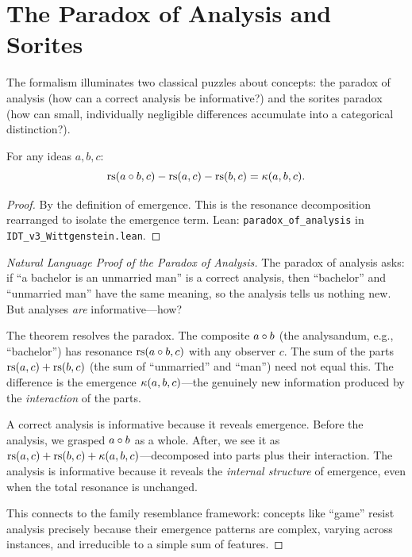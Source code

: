 \section{The Paradox of Analysis and Sorites}

The formalism illuminates two classical puzzles about concepts: the paradox of
analysis (how can a correct analysis be informative?) and the sorites paradox
(how can small, individually negligible differences accumulate into a categorical
distinction?).

\begin{theorem}
\label{thm:paradox-analysis}
For any ideas $a, b, c$:
\[
\mathrm{rs}(a \circ b, c) - \mathrm{rs}(a, c) - \mathrm{rs}(b, c) = \kappa(a, b, c).
\]
\end{theorem}

\begin{proof}
By the definition of emergence. This is the resonance decomposition rearranged
to isolate the emergence term.
Lean: \texttt{paradox\_of\_analysis} in \texttt{IDT\_v3\_Wittgenstein.lean}.
\end{proof}

\begin{proof}[Natural Language Proof of the Paradox of Analysis]
The paradox of analysis asks: if ``a bachelor is an unmarried man'' is a correct
analysis, then ``bachelor'' and ``unmarried man'' have the same meaning, so the
analysis tells us nothing new. But analyses \emph{are} informative---how?

The theorem resolves the paradox. The composite $a \circ b$ (the analysandum,
e.g., ``bachelor'') has resonance $\mathrm{rs}(a \circ b, c)$ with any observer $c$.
The sum of the parts $\mathrm{rs}(a, c) + \mathrm{rs}(b, c)$ (the sum of ``unmarried'' and ``man'')
need not equal this. The difference is the emergence $\kappa(a, b, c)$---the
genuinely new information produced by the \emph{interaction} of the parts.

A correct analysis is informative because it reveals emergence. Before the
analysis, we grasped $a \circ b$ as a whole. After, we see it as
$\mathrm{rs}(a, c) + \mathrm{rs}(b, c) + \kappa(a, b, c)$---decomposed into parts plus their
interaction. The analysis is informative because it reveals the \emph{internal
structure} of emergence, even when the total resonance is unchanged.

This connects to the family resemblance framework: concepts like ``game'' resist
analysis precisely because their emergence patterns are complex, varying across
instances, and irreducible to a simple sum of features.
\end{proof}

